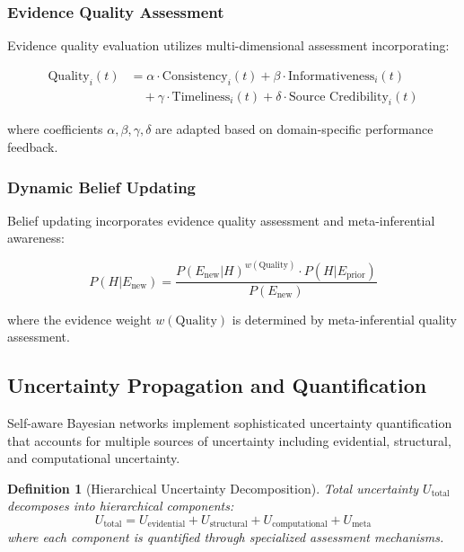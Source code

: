 \documentclass[12pt,a4paper]{article}
\newtheorem{definition}[theorem]{Definition}
\begin{document}
\subsubsection{Evidence Quality Assessment}

Evidence quality evaluation utilizes multi-dimensional assessment incorporating:

\begin{align}
\text{Quality}_i(t) &= \alpha \cdot \text{Consistency}_i(t) + \beta \cdot \text{Informativeness}_i(t) \\
&\quad + \gamma \cdot \text{Timeliness}_i(t) + \delta \cdot \text{Source Credibility}_i(t)
\end{align}

where coefficients $\alpha, \beta, \gamma, \delta$ are adapted based on domain-specific performance feedback.

\subsubsection{Dynamic Belief Updating}

Belief updating incorporates evidence quality assessment and meta-inferential awareness:

\begin{equation}
P(H | E_{\text{new}}) = \frac{P(E_{\text{new}} | H)^{w(\text{Quality})} \cdot P(H | E_{\text{prior}})}{P(E_{\text{new}})}
\end{equation}

where the evidence weight $w(\text{Quality})$ is determined by meta-inferential quality assessment.

\subsection{Uncertainty Propagation and Quantification}

Self-aware Bayesian networks implement sophisticated uncertainty quantification that accounts for multiple sources of uncertainty including evidential, structural, and computational uncertainty.

\begin{definition}[Hierarchical Uncertainty Decomposition]
Total uncertainty $U_{\text{total}}$ decomposes into hierarchical components:
\begin{equation}
U_{\text{total}} = U_{\text{evidential}} + U_{\text{structural}} + U_{\text{computational}} + U_{\text{meta}}
\end{equation}
where each component is quantified through specialized assessment mechanisms.
\end{definition}
\end{document}
